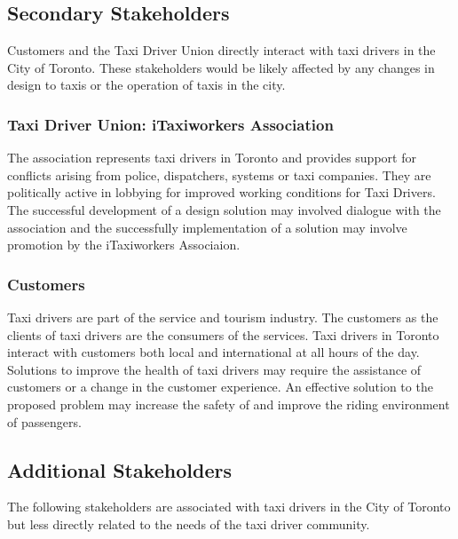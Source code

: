\documentclass[11pt]{article}
\begin{document}
\subsection{Secondary Stakeholders} 
Customers and the Taxi Driver Union directly interact with taxi 
drivers in the City of Toronto. These stakeholders would be likely 
affected by any changes in design to taxis or the operation of taxis 
in the city. 

\subsubsection{Taxi Driver Union: iTaxiworkers Association}
The association represents taxi drivers in Toronto and provides 
support for conflicts arising from police, dispatchers, systems or 
taxi companies. They are politically active in lobbying for improved 
working conditions for Taxi Drivers. The successful development of a 
design solution may involved dialogue with the association and the 
successfully implementation of a solution may involve promotion by the 
iTaxiworkers Associaion\cite{itaxi}. 

\subsubsection{Customers}
Taxi drivers are part of the service and tourism industry. The customers 
as the clients of taxi drivers are the consumers of the services. Taxi 
drivers in Toronto interact with customers both local and international 
at all hours of the day. Solutions to improve the health of taxi drivers 
may require the assistance of customers or a change in the customer 
experience. An effective solution to the proposed problem may increase 
the safety of and improve the riding environment of passengers. 
 
\subsection{Additional Stakeholders}

The following stakeholders are associated with taxi drivers in the City 
of Toronto but less directly related to the needs of the taxi driver 
community. 
\end{document}
